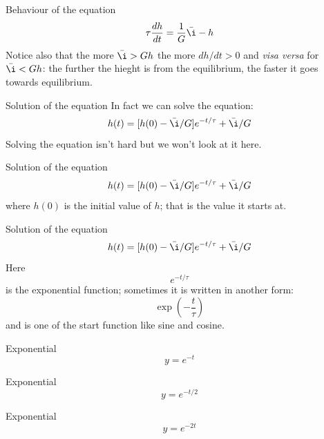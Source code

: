 \documentclass{beamer}
\newcommand{\crish}{\color{reddish}}
\newcommand{\cbla}{\color{black}}
\newcommand{\cblu}{\color{blue}}
\begin{document}
\begin{frame}{Behaviour of the equation}
  \crish
  $$\tau\frac{dh}{dt}=\frac{1}{G}\bar{\i}-h$$\cbla Notice also that the more
  \crish{}$\bar{\i}>Gh$\cbla{} the more \crish{}$dh/dt>0$\cbla{} and \textsl{visa versa} for \crish{}$\bar{\i}<Gh$\cbla: the further the hieght is from the equilibrium, the faster it goes towards equilibrium.
\end{frame}


\begin{frame}{Solution of the equation}
  In fact we can solve the equation:\crish{}
$$h(t)=[h(0)-\bar{\i}/G]e^{-t/\tau}+\bar{\i}/G$$
\cbla{}Solving the equation isn't hard but we won't look at it here.
\end{frame}


\begin{frame}{Solution of the equation}
  \crish{}
$$h(t)=[\cblu{}h(0)\crish{}-\bar{\i}/G]e^{-t/\tau}+\bar{\i}/G$$
\cbla{}where \cblu$h(0)$\cbla{} is the initial value of \crish$h$\cbla{}; that is the value it starts at.
\end{frame}


\begin{frame}{Solution of the equation}
  \crish{}
$$h(t)=[h(0)-\bar{\i}/G]\cblu{}e^{-t/\tau}\crish{}+\bar{\i}/G$$
\cbla{}Here\cblu
$$e^{-t/\tau}$$
\cbla{}is the \cblu{}exponential function\cbla{}; sometimes it is written in another form:
\cblu
$$\exp{\left(-\frac{t}{\tau}\right)}$$
\cbla{}and is one of the start function like sine and cosine.
\end{frame}

\begin{frame}{Exponential}
  \crish$$y=e^{-t}$$
  \begin{center}
    
  \end{center}
  \end{frame}


\begin{frame}{Exponential}
  \crish$$y=e^{-t/2}$$
  \begin{center}
    
  \end{center}
  \end{frame}


\begin{frame}{Exponential}
  \crish$$y=e^{-2t}$$
  \begin{center}
    
  \end{center}
  \end{frame}
\end{document}

